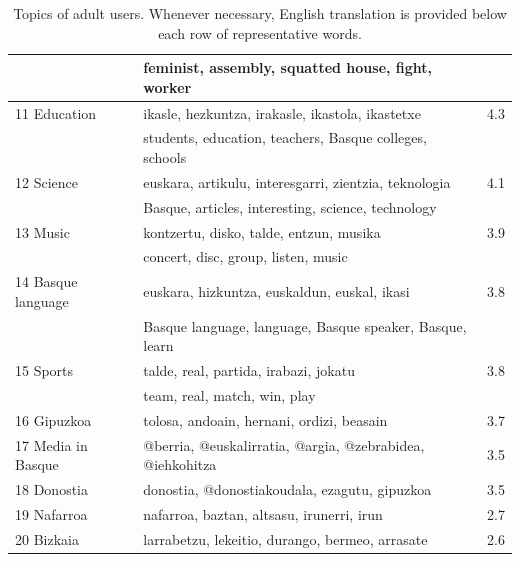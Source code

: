 \documentclass[information,article,submit,moreauthors,pdftex,10pt,a4paper]{Definitions/mdpi}
\begin{document}
\begin{table}[H]
\begin{tabular}{llc}
                   & feminist, assembly, squatted house, fight, worker & \\ \hline
                   11 Education & ikasle, hezkuntza, irakasle, ikastola, ikastetxe & 4.3 \\
                   & students, education, teachers, Basque colleges, schools & \\ \hline
                   12 Science & euskara, artikulu, interesgarri, zientzia, teknologia & 4.1 \\
                   &  Basque, articles, interesting, science, technology& \\ \hline
                   13 Music & kontzertu, disko, talde, entzun, musika & 3.9 \\
                   & concert, disc, group, listen, music & \\ \hline
                   14 Basque language & euskara, hizkuntza, euskaldun, euskal, ikasi & 3.8 \\
                   & Basque language, language, Basque speaker, Basque, learn & \\ \hline
                   15 Sports & talde, real, partida, irabazi, jokatu & 3.8 \\
                   & team, real, match, win, play & \\ \hline
                   16 Gipuzkoa & tolosa, andoain, hernani, ordizi, beasain & 3.7  \\ \hline
                   17 Media in Basque & @berria, @euskalirratia, @argia, @zebrabidea, @iehkohitza & 3.5  \\ \hline
                   18 Donostia & donostia, @donostiakoudala, ezagutu, gipuzkoa & 3.5  \\ \hline
                   19 Nafarroa & nafarroa, baztan, altsasu, irunerri, irun & 2.7  \\ \hline
                   20 Bizkaia & larrabetzu, lekeitio, durango, bermeo, arrasate & 2.6 \\ \hline
  \end{tabular}
  \caption{Topics of adult users. Whenever necessary, English translation is provided below each row of representative words.}
  \label{tab:adult-tp}
\end{table}
\end{document}
